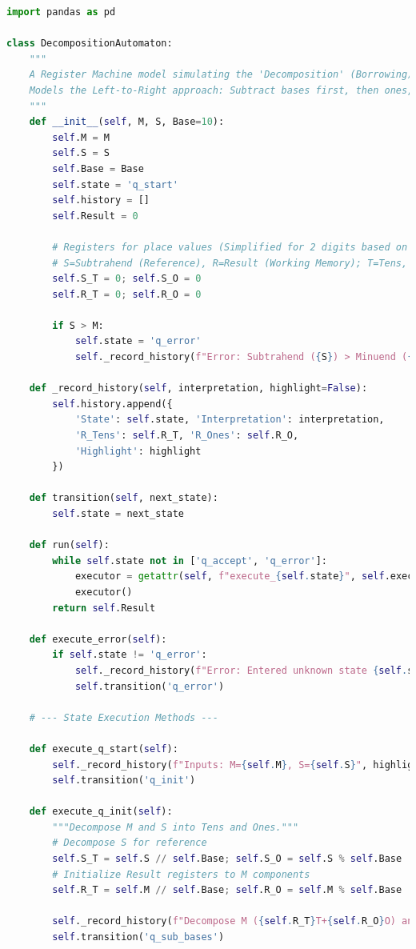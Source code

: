 \documentclass[11pt]{article}
\begin{document}
\begin{lstlisting}[language=Python]
import pandas as pd

class DecompositionAutomaton:
    """
    A Register Machine model simulating the 'Decomposition' (Borrowing) strategy for subtraction.
    Models the Left-to-Right approach: Subtract bases first, then ones, decomposing if necessary.
    """
    def __init__(self, M, S, Base=10):
        self.M = M
        self.S = S
        self.Base = Base
        self.state = 'q_start'
        self.history = []
        self.Result = 0

        # Registers for place values (Simplified for 2 digits based on the example)
        # S=Subtrahend (Reference), R=Result (Working Memory); T=Tens, O=Ones
        self.S_T = 0; self.S_O = 0
        self.R_T = 0; self.R_O = 0

        if S > M:
            self.state = 'q_error'
            self._record_history(f"Error: Subtrahend ({S}) > Minuend ({M}).")

    def _record_history(self, interpretation, highlight=False):
        self.history.append({
            'State': self.state, 'Interpretation': interpretation,
            'R_Tens': self.R_T, 'R_Ones': self.R_O,
            'Highlight': highlight
        })

    def transition(self, next_state):
        self.state = next_state

    def run(self):
        while self.state not in ['q_accept', 'q_error']:
            executor = getattr(self, f"execute_{self.state}", self.execute_error)
            executor()
        return self.Result

    def execute_error(self):
        if self.state != 'q_error':
            self._record_history(f"Error: Entered unknown state {self.state}")
            self.transition('q_error')

    # --- State Execution Methods ---

    def execute_q_start(self):
        self._record_history(f"Inputs: M={self.M}, S={self.S}", highlight=True)
        self.transition('q_init')

    def execute_q_init(self):
        """Decompose M and S into Tens and Ones."""
        # Decompose S for reference
        self.S_T = self.S // self.Base; self.S_O = self.S % self.Base
        # Initialize Result registers to M components
        self.R_T = self.M // self.Base; self.R_O = self.M % self.Base

        self._record_history(f"Decompose M ({self.R_T}T+{self.R_O}O) and S ({self.S_T}T+{self.S_O}O).")
        self.transition('q_sub_bases')


\end{lstlisting}
\end{document}
